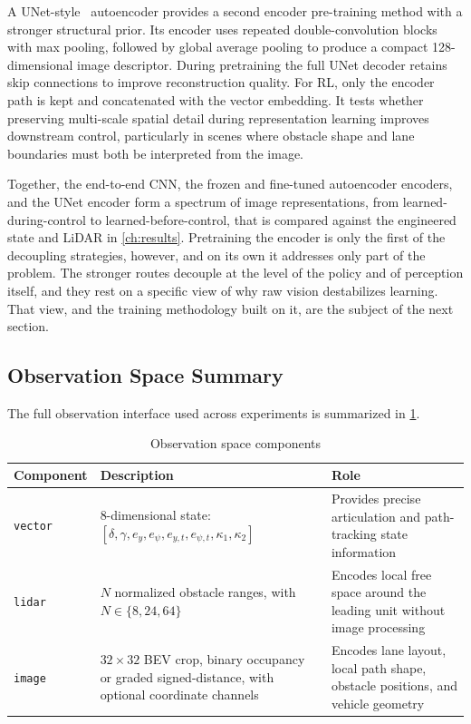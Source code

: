 A UNet-style~\cite{ronneberger2015unet} autoencoder provides a second encoder pre-training method with a stronger structural prior. Its encoder uses repeated double-convolution blocks with max pooling, followed by global average pooling to produce a compact 128-dimensional image descriptor. During pretraining the full UNet decoder retains skip connections to improve reconstruction quality. For RL, only the encoder path is kept and concatenated with the vector embedding. It tests whether preserving multi-scale spatial detail during representation learning improves downstream control, particularly in scenes where obstacle shape and lane boundaries must both be interpreted from the image.

Together, the end-to-end CNN, the frozen and fine-tuned autoencoder encoders, and the UNet encoder form a spectrum of image representations, from learned-during-control to learned-before-control, that is compared against the engineered state and LiDAR in \cref{ch:results}. Pretraining the encoder is only the first of the decoupling strategies, however, and on its own it addresses only part of the problem. The stronger routes decouple at the level of the policy and of perception itself, and they rest on a specific view of why raw vision destabilizes learning. That view, and the training methodology built on it, are the subject of the next section.

\subsection{Observation Space Summary}

The full observation interface used across experiments is summarized in \cref{tab:observation_components}.

\begin{table}[H]
\centering
\caption{Observation space components}
\label{tab:observation_components}
\begin{tabular}{p{3cm} p{5cm} p{5cm}}
\toprule
Component & Description & Role \\
\midrule
\texttt{vector} & 8-dimensional state: $[\delta,\gamma,e_y,e_\psi,e_{y,t},e_{\psi,t},\kappa_1,\kappa_2]$ & Provides precise articulation and path-tracking state information \\
\texttt{lidar} & $N$ normalized obstacle ranges, with $N \in \{8,24,64\}$ & Encodes local free space around the leading unit without image processing \\
\texttt{image}  & $32 \times 32$ BEV crop, binary occupancy or graded signed-distance, with optional coordinate channels & Encodes lane layout, local path shape, obstacle positions, and vehicle geometry \\
\bottomrule
\end{tabular}
\end{table}


